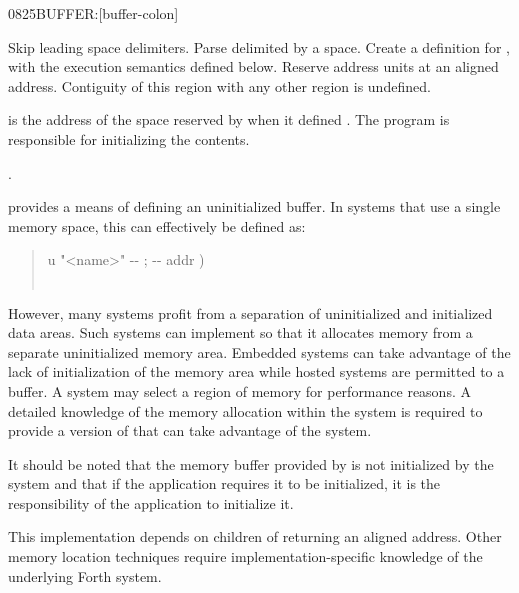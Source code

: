 \begin{worddef}{0825}{BUFFER:}[buffer-colon]%
\item {}

	Skip leading space delimiters. Parse  delimited by a space.
	Create a definition for , with the execution semantics defined
	below.  Reserve  address units at an aligned address.
	Contiguity of this region with any other region is undefined.

\execute[name]

	 is the address of the space reserved by  when
	it defined .  The program is responsible for initializing the
	contents.

\see {}.

	\begin{rationale}
		 provides a means of defining an uninitialized buffer.
		In systems that use a single memory space, this can effectively
		be defined as:

		\begin{quote}\ttfamily
			\word{:}   u "<name>" -{}- ; -{}- addr ) \\
			\tab\,  \\
			\word{;}
		\end{quote} 

		However, many systems profit from a separation of uninitialized and
		initialized data areas.  Such systems can implement  so
		that it allocates memory from a separate uninitialized memory area.
		Embedded systems can take advantage of the lack of initialization of the
		memory area while hosted systems are permitted to 
		a buffer.
		A system may select a region of memory for performance reasons.
		A detailed knowledge of the memory allocation within the system
		is required to provide a version of  that can take
		advantage of the system.

		It should be noted that the memory buffer provided by 
		is not initialized by the system and that if the application requires
		it to be initialized, it is the responsibility of the application to
		initialize it.
	\end{rationale}

	\begin{implement} %
		\dffamily
		This implementation depends on children of 
		returning an aligned address.  Other memory location techniques
		require implementation-specific knowledge of the underlying Forth
		system.


\end{implement}
\end{worddef}
